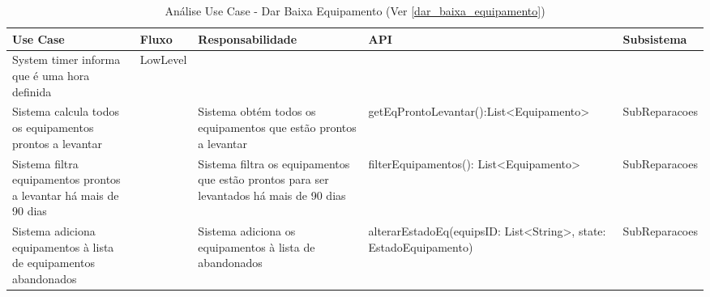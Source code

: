 \documentclass[../relatorio.tex]{subfiles}
\begin{document}
\begin{landscape}
    \begin{table}[!h]
        \centering
        \begin{tabular}{|p{5cm}|p{1cm}|p{4cm}|p{6cm}|p{3cm}|}
            \hline
            \rowcolor{gray!20!white}
            Use Case & Fluxo & Responsabilidade & API & Subsistema \\
            \hline
            \rowcolor{red}
            System timer informa que é uma hora definida
                     & LowLevel
                     &
                     &
                     &
            \\
            \hline
            Sistema calcula todos os equipamentos prontos a levantar 
                     & 
                     & Sistema obtém todos os equipamentos que estão prontos a levantar
                     & getEqProntoLevantar():List<Equipamento>
                     & SubReparacoes
            \\
            \hline
            Sistema filtra equipamentos prontos a levantar há mais de 90 dias
                     &
                     & Sistema filtra os equipamentos que estão prontos para ser levantados há mais de 90 dias
                     & filterEquipamentos(): List<Equipamento>
                     & SubReparacoes
            \\
            \hline
            Sistema adiciona equipamentos à lista de equipamentos abandonados
                     & 
                     & Sistema adiciona os equipamentos à lista de abandonados
                     & alterarEstadoEq(equipsID: List<String>, state: EstadoEquipamento)
                     & SubReparacoes
            \\
            \hline
        \end{tabular}
        \caption{Análise Use Case - Dar Baixa Equipamento (Ver \ref{dar_baixa_equipamento})}
    \end{table}
\end{landscape}
\end{document}
